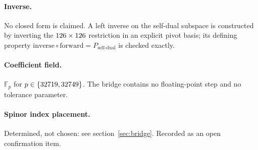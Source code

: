 \paragraph{Inverse.} No closed form is claimed. A left inverse on the self-dual
subspace is constructed by inverting the $126\times126$
restriction in an explicit pivot basis; its defining property
$\mathrm{inverse}\circ\mathrm{forward}=P_{\text{self-dual}}$ is checked exactly.

\paragraph{Coefficient field.} $\mathbb{F}_p$ for $p\in\{32719, 32749\}$. The
bridge contains no floating-point step and no tolerance parameter.

\paragraph{Spinor index placement.} Determined, not chosen: see
section~\ref{sec:bridge}. Recorded as an open confirmation item.
